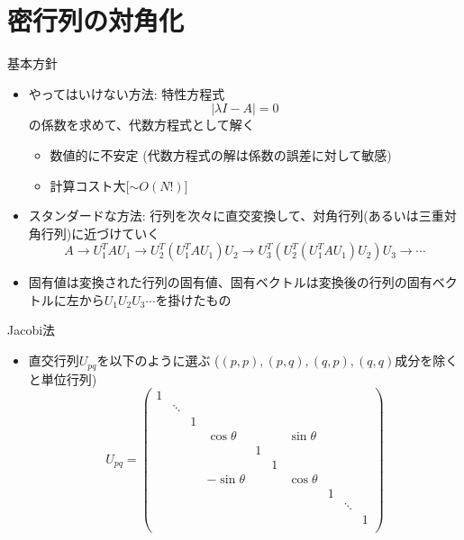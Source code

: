 \section{密行列の対角化}

\begin{frame}[t,fragile]{基本方針}
  \begin{itemize}
  \item やってはいけない方法: 特性方程式
    \[
    |\lambda I - A| = 0
    \]
    の係数を求めて、代数方程式として解く
    \begin{itemize}
    \item 数値的に不安定 (代数方程式の解は係数の誤差に対して敏感)
    \item 計算コスト大[$\sim O(N!)$]
    \end{itemize}
  \item スタンダードな方法: 行列を次々に直交変換して、対角行列(あるいは三重対角行列)に近づけていく
    \[
    A \rightarrow U_1^T A U_1 \rightarrow U_2^T (U_1^T A U_1) U_2 \rightarrow U_3^T (U_2^T (U_1^T A U_1) U_2) U_3 \rightarrow \cdots
    \]
  \item 固有値は変換された行列の固有値、固有ベクトルは変換後の行列の固有ベクトルに左から$U_1 U_2 U_3 \cdots$を掛けたもの
  \end{itemize}
\end{frame}

\begin{frame}[t,fragile]{Jacobi法}
  \begin{itemize}
    \setlength{\itemsep}{1em}
  \item 直交行列$U_{pq}$を以下のように選ぶ ($(p,p),(p,q),(q,p),(q,q)$成分を除くと単位行列)
    \[
    U_{pq} =
    \begin{pmatrix}
      1 \\
      & \ddots \\
      & & 1 \\
      & & & \cos \theta & & & \sin \theta \\
      & & & & 1 \\
      & & & & & 1 \\
      & & & -\sin \theta & & & \cos \theta \\
      & & & & & & & 1 \\
      & & & & & & & & \ddots \\
      & & & & & & & & & 1 \\
    \end{pmatrix}
    \]
  \end{itemize}
\end{frame}

